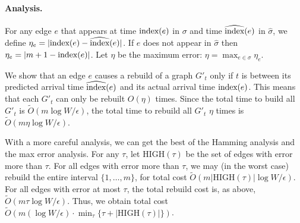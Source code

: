 \paragraph{Analysis.}
For any edge $e$ that appears at time $\text{index}(e)$ in $\sigma$ and time $\widehat{\text{index}}(e)$ in $\hat{\sigma}$, we define $\eta_e = |\text{index}(e) - \widehat{\text{index}}(e)|$.  If $e$ does not appear in $\hat{\sigma}$ then $\eta_e = |m+1-\text{index}(e)|$.
Let $\eta$ be the maximum error: $\eta = \max_{e \in \sigma} \eta_e$.
 
We show that an edge $e$ causes a rebuild of a graph $G'_t$ only if $t$ is between its predicted arrival time $\widehat{\text{index}}(e)$ and its actual arrival time $\text{index}(e)$. 
This means that each $G'_t$ can only be rebuilt $O(\eta)$ times.  Since the total time to build all $G'_t$ is $\tilde{O}(m \log W/\epsilon)$, the total time to rebuild all $G'_t$ $\eta$ times is $\tilde{O}(m\eta\log W/\epsilon)$.

With a more careful analysis, we can get the best of the Hamming analysis and the max error analysis.  For any $\tau$, let $\text{HIGH}(\tau)$ be the set of edges with error more than $\tau$.  For all edges with error more than $\tau$, we may (in the worst case) rebuild the entire interval $\{1, \ldots, m\}$, for total cost $\tilde{O}(m |\text{HIGH}(\tau)| \log W/\epsilon)$.  For all edges with error at most $\tau$, the total rebuild cost is, as above, $\tilde{O}(m\tau\log W/\epsilon)$.  Thus, we obtain total cost $ \tilde{O}\left(m (\log W/\epsilon) \cdot \min_{\tau} \{ \tau+|\text{HIGH}(\tau)| \}\right)$.